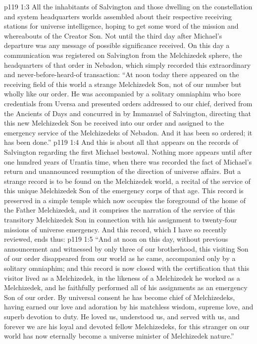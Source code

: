 \vs p119 1:3 All the inhabitants of Salvington and those dwelling on the constellation and system headquarters worlds assembled about their respective receiving stations for universe intelligence, hoping to get some word of the mission and whereabouts of the Creator Son. Not until the third day after Michael’s departure was any message of possible significance received. On this day a communication was registered on Salvington from the Melchizedek sphere, the headquarters of that order in Nebadon, which simply recorded this extraordinary and never\hyp{}before\hyp{}heard\hyp{}of transaction: “At noon today there appeared on the receiving field of this world a strange Melchizedek Son, not of our number but wholly like our order. He was accompanied by a solitary omniaphim who bore credentials from Uversa and presented orders addressed to our chief, derived from the Ancients of Days and concurred in by Immanuel of Salvington, directing that this new Melchizedek Son be received into our order and assigned to the emergency service of the Melchizedeks of Nebadon. And it has been so ordered; it has been done.”
\vs p119 1:4 And this is about all that appears on the records of Salvington regarding the first Michael bestowal. Nothing more appears until after one hundred years of Urantia time, when there was recorded the fact of Michael’s return and unannounced resumption of the direction of universe affairs. But a strange record is to be found on the Melchizedek world, a recital of the service of this unique Melchizedek Son of the emergency corps of that age. This record is preserved in a simple temple which now occupies the foreground of the home of the Father Melchizedek, and it comprises the narration of the service of this transitory Melchizedek Son in connection with his assignment to twenty\hyp{}four missions of universe emergency. And this record, which I have so recently reviewed, ends thus:
\vs p119 1:5 “And at noon on this day, without previous announcement and witnessed by only three of our brotherhood, this visiting Son of our order disappeared from our world as he came, accompanied only by a solitary omniaphim; and this record is now closed with the certification that this visitor lived as a Melchizedek, in the likeness of a Melchizedek he worked as a Melchizedek, and he faithfully performed all of his assignments as an emergency Son of our order. By universal consent he has become chief of Melchizedeks, having earned our love and adoration by his matchless wisdom, supreme love, and superb devotion to duty. He loved us, understood us, and served with us, and forever we are his loyal and devoted fellow Melchizedeks, for this stranger on our world has now eternally become a universe minister of Melchizedek nature.”
